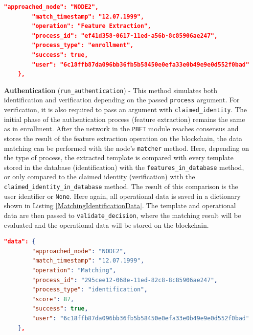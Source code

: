 \begin{description}
\begin{lstlisting}[language=json,frame=single,breaklines=true, caption={Transaction data of feature extraction in enrollment.},captionpos=b, label={FeatureExtractionEnrollmentData}]
        "approached_node": "NODE2",
        "match_timestamp": "12.07.1999",
        "operation": "Feature Extraction",
        "process_id": "ef41d358-0617-11ed-a56b-8c85906ae247",
        "process_type": "enrollment",
        "success": true,
        "user": "6c18ffb87da096bb36fb5b58450e0efa33e0b49e9e0d552f0bad"
    },
    \end{lstlisting}
    \item \textbf{Authentication} (\texttt{run\_authentication}) - This method simulates both identification and verification depending on the passed \texttt{process} argument. For verification, it is also required to pass an argument with \texttt{claimed\_identity}. The initial phase of the authentication process (feature extraction) remains the same as in enrollment. After the network in the \texttt{PBFT} module reaches consensus and stores the result of the feature extraction operation on the blockchain, the data matching can be performed with the node's \texttt{matcher} method. Here, depending on the type of process, the extracted template is compared with every template stored in the database (identification) with the \texttt{features\_in\_database} method, or only compared to the claimed identity (verification) with the \texttt{claimed\_identity\_in\_database} method. The result of this comparison is the user identifier or \texttt{None}. Here again, all operational data is saved in a dictionary shown in Listing \ref{MatchingIdentificationData}. The template and operational data are then passed to \texttt{validate\_decision}, where the matching result will be evaluated and the operational data will be stored on the blockchain.
    \newpage
    \begin{lstlisting}[language=json,frame=single,breaklines=true, caption={Transaction data of feature extraction in enrollment.},captionpos=b, label={MatchingIdentificationData}]
    "data": {
        "approached_node": "NODE2",
        "match_timestamp": "12.07.1999",
        "operation": "Matching",
        "process_id": "295cee12-068e-11ed-82c8-8c85906ae247",
        "process_type": "identification",
        "score": 87,
        "success": true,
        "user": "6c18ffb87da096bb36fb5b58450e0efa33e0b49e9e0d552f0bad"
    },
    \end{lstlisting}
\end{description}
